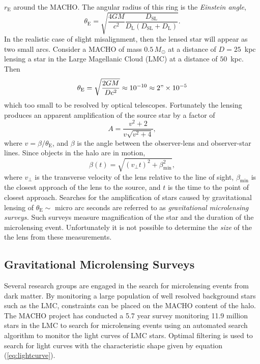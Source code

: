 $r_\mathrm{E}$ around the MACHO. The angular radius of this ring is the
\emph{Einstein angle},
\begin{equation}
\theta_\mathrm{E} = \sqrt{\frac{4GM}{c^2} \frac{D_\mathrm{SL}}
{D_\mathrm{L}\left(D_\mathrm{SL} + D_\mathrm{L}\right)}}.
\end{equation}
In the realistic case of slight misalignment, then the lensed star will appear
as two small arcs. Consider a MACHO of mass $0.5\,M_\odot$ at a distance of $D
= 25$~kpc lensing a star in the Large Magellanic Cloud (LMC) at a distance of
$50$~kpc. Then
\begin{equation}
\theta_\mathrm{E} = \sqrt{\frac{2GM}{Dc^2}} \approx 10^{-10} \approx 2" \times
10^{-5}
\end{equation}
which too small to be resolved by optical telescopes. Fortunately the lensing
produces an apparent amplification of the source star by a factor
of\cite{1964MNRAS.128..295R}
\begin{equation}
A = \frac{v^2 + 2}{v\sqrt{v^2 + 4}},
\label{eq:lightcurve}
\end{equation}
where $v = \beta / \theta_\mathrm{E}$, and $\beta$ is the angle between the
observer-lens and observer-star lines. Since objects in the halo are in
motion,
\begin{equation}
\beta(t) = \sqrt{ (v_\perp t)^2 + \beta_\mathrm{min}^2 },
\end{equation}
where $v_\perp$ is the transverse velocity of the lens relative to the 
line of sight, $\beta_\mathrm{min}$ is the closest approach of the lens to
the source, and $t$ is the time to the point of closest
approach\cite{Paczynski:1985jf,Griest:1990vu}. 
Searches for the amplification of stars caused by gravitational lensing of
$\theta_\mathrm{E} \sim $ micro arc seconds are referred to as
\emph{gravitational microlensing surveys.} Such surveys measure
magnification of the star and the duration of the microlensing event. 
Unfortunately it is not possible to determine the \emph{size} of the
the lens from these measurements.

\subsection{Gravitational Microlensing Surveys}

Several research groups are engaged in the search for microlensing events from
dark matter\cite{Alcock:2000ph,Afonso:2002xq}. By monitoring a large
population of well resolved background stars such as the LMC, constraints can
be placed on the MACHO content of the halo. The MACHO project has conducted a
5.7 year survey monitoring 11.9 million stars in the LMC to search for
microlensing events\cite{Alcock:2000ph} using an automated search algorithm to
monitor the light curves of LMC stars. Optimal filtering is used to search for
light curves with the characteristic shape given by equation
(\ref{eq:lightcurve}).

